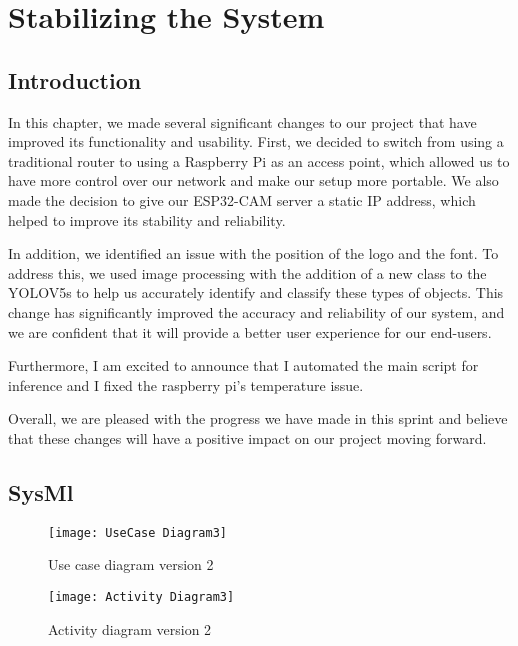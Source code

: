 %
%



\chapter{Stabilizing the System}
\section{Introduction}
In this chapter, we made several significant changes to our project that have improved its functionality and usability. First, we decided to switch from using a traditional router to using a Raspberry Pi as an access point, which allowed us to have more control over our network and make our setup more portable. We also made the decision to give our ESP32-CAM server a static IP address, which helped to improve its stability and reliability.

In addition, we identified an issue with the position of the logo and the font. To address this, we used image processing with the addition of a new class to the YOLOV5s to help us accurately identify and classify these types of objects. This change has significantly improved the accuracy and reliability of our system, and we are confident that it will provide a better user experience for our end-users.

Furthermore, I am excited to announce that I automated the main script for inference and I fixed the raspberry pi's temperature issue.

Overall, we are pleased with the progress we have made in this sprint and believe that these changes will have a positive impact on our project moving forward.
\section{SysMl}

\FloatBarrier
\begin{figure}[h]

         \centering
        \texttt{[image: UseCase Diagram3]}
   
        \caption{Use case diagram version 2}
        \label{Use case diagram version 2}

    \end{figure}


\FloatBarrier
\FloatBarrier
\begin{figure}[h]
\FloatBarrier
         \centering
        \texttt{[image: Activity Diagram3]}
   
        \caption{Activity diagram version 2}
        \label{Activity diagram version 2}
\FloatBarrier
    \end{figure}


